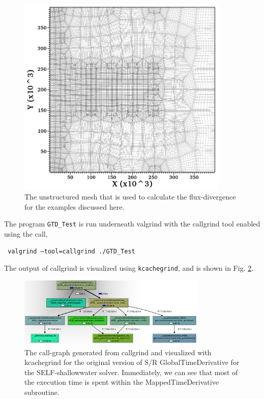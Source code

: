 \documentclass{softwaremanual}
\begin{document}
\begin{figure}
\begin{center}
\includegraphics[width=0.9\textwidth]{projectFigures/boxmesh.png}
\caption{The unstructured mesh that is used to calculate the flux-divergence for the examples discussed here.}\label{fig:boxmesh}
\end{center}
\end{figure}

The program \texttt{GTD\_Test} is run underneath valgrind with the callgrind tool enabled using the call,
\begin{center}
\texttt{ valgrind --tool=callgrind ./GTD\_Test }
\end{center}
The output of callgrind is visualized using \texttt{kcachegrind}, and is shown in Fig. \ref{fig:OrignalCallGraph}.

\begin{figure}
\begin{center}
\includegraphics[width=0.8\textwidth]{projectFigures/callgraphOriginal.png}
\caption{The call-graph generated from callgrind and visualized with kcachegrind for the original version of S/R GlobalTimeDerivative for the SELF-shallowwater solver. Immediately, we can see that most of the execution time is spent within the MappedTimeDerivative subroutine.}\label{fig:OrignalCallGraph}
\end{center}
\end{figure}
\end{document}
